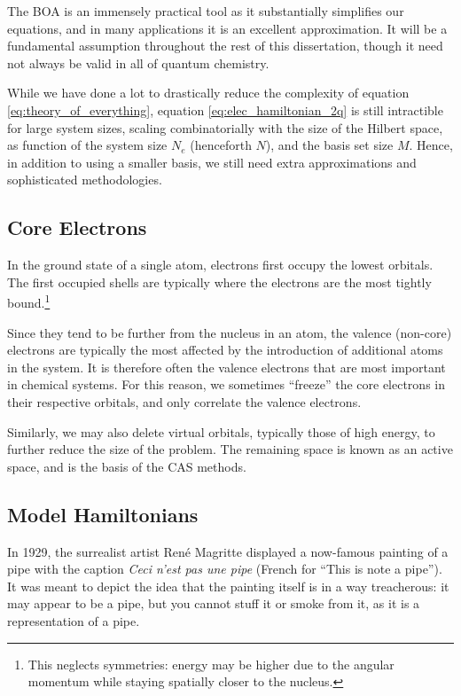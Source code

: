 The \gls{BOA} is an immensely practical tool as it substantially simplifies our equations, and in many applications it is an excellent approximation. It will be a fundamental assumption throughout the rest of this dissertation, though it need not always be valid in all of quantum chemistry.

While we have done a lot to drastically reduce the complexity of equation \eqref{eq:theory_of_everything}, equation \eqref{eq:elec_hamiltonian_2q} is still intractible for large system sizes, scaling combinatorially with the size of the Hilbert space, as function of the system size $N_e$ (henceforth $N$), and the basis set size $M$. Hence, in addition to using a smaller basis, we still need extra approximations and sophisticated methodologies.


\subsection{Core Electrons}

In the ground state of a single atom, electrons first occupy the lowest orbitals. The first occupied shells are typically where the electrons are the most tightly bound.\footnote{This neglects symmetries: energy may be higher due to the angular momentum while staying spatially closer to the nucleus.}

Since they tend to be further from the nucleus in an atom, the valence (non-core) electrons are typically the most affected by the introduction of additional atoms in the system. It is therefore often the valence electrons that are most important in chemical systems. For this reason, we sometimes ``freeze'' the core electrons in their respective orbitals, and only correlate the valence electrons.

Similarly, we may also delete virtual orbitals, typically those of high energy, to further reduce the size of the problem. The remaining space is known as an active space, and is the basis of the \gls{CAS} methods.


\subsection{Model Hamiltonians}

In 1929, the surrealist artist Ren\'e Magritte displayed a now-famous painting of a pipe with the caption \emph{Ceci n'est pas une pipe} (French for ``This is note a pipe''). It was meant to depict the idea that the painting itself is in a way treacherous: it may appear to be a pipe, but you cannot stuff it or smoke from it, as it is a representation of a pipe.

